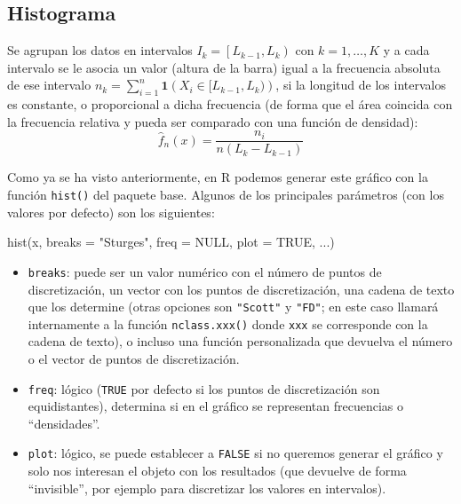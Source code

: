 \documentclass[
]{book}
\newenvironment{Shaded}{\begin{snugshade}}{\end{snugshade}}
\newcommand{\AttributeTok}[1]{\textcolor[rgb]{0.77,0.63,0.00}{#1}}
\newcommand{\ConstantTok}[1]{\textcolor[rgb]{0.00,0.00,0.00}{#1}}
\newcommand{\FunctionTok}[1]{\textcolor[rgb]{0.00,0.00,0.00}{#1}}
\newcommand{\NormalTok}[1]{#1}
\newcommand{\StringTok}[1]{\textcolor[rgb]{0.31,0.60,0.02}{#1}}
\theoremstyle{break}
\theoremstyle{nonumberplain}
\begin{document}
\hypertarget{histograma}{%
\subsection{Histograma}\label{histograma}}

Se agrupan los datos en intervalos \(I_{k}=\left[ L_{k-1},L_{k}\right)\) con \(k=1, \ldots, K\) y a cada intervalo se le asocia un valor (altura de la barra) igual a la frecuencia absoluta de ese intervalo \(n_k = \sum_{i=1}^{n}\mathbf{1}\left( X_i \in [L_{k-1},L_{k}) \right)\), si la longitud de los intervalos es constante, o proporcional a dicha frecuencia (de forma que el área coincida con la frecuencia relativa y pueda ser comparado con una función de densidad):
\[\hat{f}_n(x)=\frac{n_{i}}{n\left(  L_{k}-L_{k-1}\right)}\]

Como ya se ha visto anteriormente, en R podemos generar este gráfico con la función \texttt{hist()} del paquete base.
Algunos de los principales parámetros (con los valores por defecto) son los siguientes:

\begin{Shaded}
\begin{Highlighting}[]
\FunctionTok{hist}\NormalTok{(x, }\AttributeTok{breaks =} \StringTok{"Sturges"}\NormalTok{, }\AttributeTok{freq =} \ConstantTok{NULL}\NormalTok{, }\AttributeTok{plot =} \ConstantTok{TRUE}\NormalTok{, ...)}
\end{Highlighting}
\end{Shaded}

\begin{itemize}
\item
  \texttt{breaks}: puede ser un valor numérico con el número de puntos de discretización, un vector con los puntos de discretización, una cadena de texto que los determine (otras opciones son \texttt{"Scott"} y \texttt{"FD"}; en este caso llamará internamente a la función \texttt{nclass.xxx()} donde \texttt{xxx} se corresponde con la cadena de texto), o incluso una función personalizada que devuelva el número o el vector de puntos de discretización.
\item
  \texttt{freq}: lógico (\texttt{TRUE} por defecto si los puntos de discretización son equidistantes), determina si en el gráfico se representan frecuencias o ``densidades''.
\item
  \texttt{plot}: lógico, se puede establecer a \texttt{FALSE} si no queremos generar el gráfico y solo nos interesan el objeto con los resultados (que devuelve de forma ``invisible'', por ejemplo para discretizar los valores en intervalos).
\end{itemize}
\end{document}

